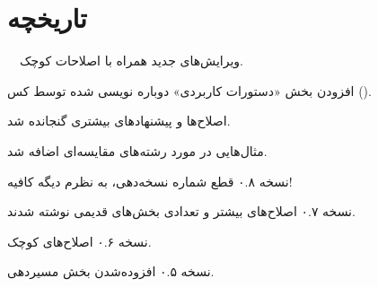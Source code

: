 \section*{تاریخچه}
\quad \ \ ویرایش‌های جدید همراه با اصلاحات کوچک.

افزودن بخش «دستورات کاربردی» دوباره نویسی شده توسط کس ().

اصلاح‌ها و پیشنهادهای بیشتری گنجانده شد‌.

مثال‌هایی در مورد رشته‌های مقایسه‌ای اضافه شد‌.

نسخه ۰.۸ قطع شماره نسخه‌دهی‌، به نظرم دیگه کافیه‌!

نسخه ۰.۷ اصلاح‌های بیشتر و تعدادی بخش‌های  قدیمی نوشته شدند‌.

نسخه ۰.۶ اصلاح‌های کوچک‌.

نسخه ۰.۵ افزوده‌شدن بخش مسیردهی‌.
